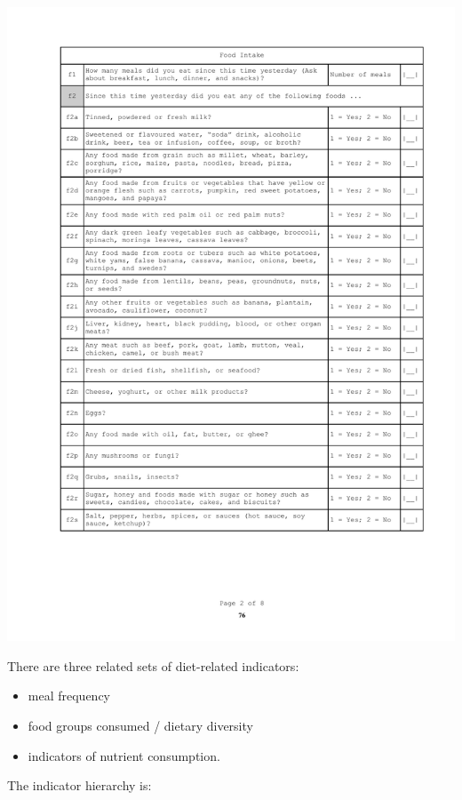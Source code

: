 \documentclass[12pt,a4paper]{book}
\providecommand{\tightlist}{%
  \setlength{\itemsep}{0pt}\setlength{\parskip}{0pt}}
\theoremstyle{definition}
\theoremstyle{definition}
\theoremstyle{definition}
\theoremstyle{remark}
\begin{document}
\begin{center}\includegraphics{figures/questionnaire02} \end{center}

\newpage

There are three related sets of diet-related indicators:

\begin{itemize}
\tightlist
\item
  meal frequency
\item
  food groups consumed / dietary diversity
\item
  indicators of nutrient consumption.
\end{itemize}

The indicator hierarchy is:
\end{document}
